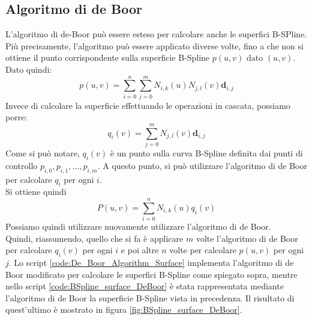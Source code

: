 \documentclass[a4paper, 12pt]{article}
\begin{document}
\subsection{Algoritmo di de Boor}
L'algoritmo di de-Boor può essere esteso per calcolare anche le superfici B-SPline. Più precisamente,  l'algoritmo può essere applicato diverse volte, fino a che non si ottiene il punto corrispondente sulla superficie B-Spline $p(u,v)$ dato $(u,v)$. Dato quindi:
$$p(u, v) = \sum_{i = 0}^{n} \sum_{j = 0}^{m}  N_{i,k}(u)N_{j,l}(v) \mathbf{d}_{i, j} $$
Invece di calcolare la superficie effettuando le operazioni in cascata, possiamo porre:\\
$$q_i(v) = \sum_{j = 0}^{m}  N_{j,l}(v) \mathbf{d}_{i, j} $$
Come si può notare, $q_i(v)$ è un punto sulla curva B-Spline definita dai punti di controllo $p_{i,0},p_{i,1}, \dots, p_{i,m}$.
A questo punto, si può utilizzare l'algoritmo di de Boor per calcolare $q_i$ per ogni $i$.\\
Si ottiene quindi 
$$P(u,v) = \sum_{i = 0}^{n}  N_{i,k}(u) q_i(v)$$
Possiamo quindi utilizzare nuovamente utilizzare l'algoritmo di de Boor.\\
Quindi, riassumendo, quello che si fa è applicare $m$ volte l'algoritmo di de Boor per calcolare $q_i(v)$ per ogni $i$ e poi altre $n$ volte per calcolare $p(u,v)$ per ogni $j$.
Lo script \ref{code:De_Boor_Algorithm_Surface} implementa l'algoritmo di de Boor modificato per calcolare le superfici B-Spline come spiegato sopra, mentre nello script \ref{code:BSpline_surface_DeBoor} è stata rappresentata mediante l'algoritmo di de Boor la superficie B-Spline vista in precedenza. Il risultato di quest'ultimo è mostrato in figura \ref{fig:BSpline_surface_DeBoor}.



\end{document}
